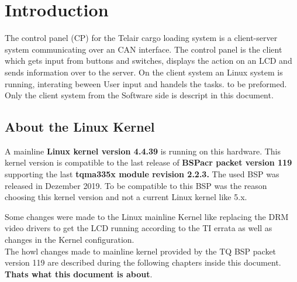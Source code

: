 \chapter{Introduction} \label{chp:einleitung}

The control panel (CP) for the Telair cargo loading system is a client-server
system communicating over an CAN interface. The control panel
is the client which gets input from buttons and switches, displays the action
on an LCD and sends information over to the server. On the client system an
Linux system is running, interating beween User input and handels the tasks.
to be preformed. Only the client system from the Software side is descript in
this document.

\section{About the Linux Kernel}%
\label{sec:About the Linux Kernel}

A mainline \textbf{Linux kernel version 4.4.39} is running on this hardware.
This kernel version is compatible to the last release of \textbf{\gls{BSPacr}
packet version 119} supporting the last \textbf{tqma335x module revision 2.2.3.}
The used \gls{BSP} was released in Dezember 2019. To be compatible to this
BSP was the reason choosing this kernel version and not a current Linux kernel
like 5.x.

Some changes were made to the Linux mainline Kernel like replacing the DRM video
drivers to get the LCD running according to the TI errata
\cite{TI_am335x_errata} as well as changes in the Kernel configuration. \\

The howl changes made to mainline kernel provided by the TQ BSP packet version
119 \cite{tq_bsp119} are described during the following chapters inside this
document. \textbf{Thats what this document is about}.
